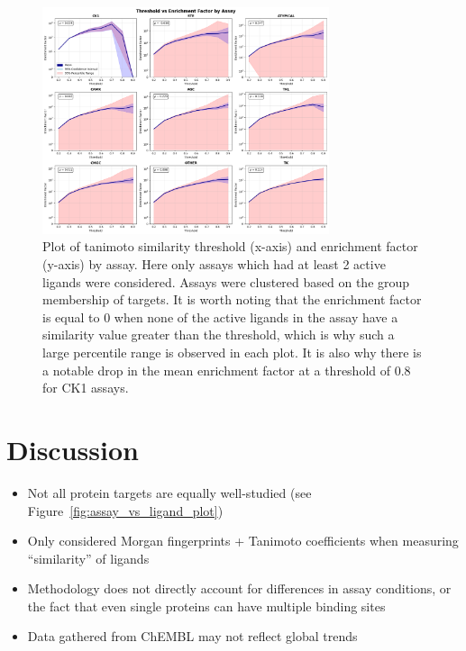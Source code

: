 \documentclass[11pt]{article}
\begin{document}
\begin{figure}[H]
    \centering
    \includegraphics[width=0.75\textwidth]{../figures/enrichment_factor_by_assay.png}
    \caption{Plot of tanimoto similarity threshold (x-axis) and enrichment factor (y-axis) by assay. Here only assays which had at least 2 active ligands were considered. Assays were clustered based on the group membership of targets. It is worth noting that the enrichment factor is equal to $0$ when none of the active ligands in the assay have a similarity value greater than the threshold, which is why such a large percentile range is observed in each plot. It is also why there is a notable drop in the mean enrichment factor at a threshold of $0.8$ for CK1 assays.}\label{fig:enrichment_by_assay}
\end{figure}

\section{Discussion}\label{sec:discussion}
\begin{itemize}
    \item Not all protein targets are equally well-studied (see Figure~\ref{fig:assay_vs_ligand_plot})
    \item Only considered Morgan fingerprints + Tanimoto coefficients when measuring ``similarity'' of ligands
    \item Methodology does not directly account for differences in assay conditions, or the fact that even single proteins can have multiple binding sites
    \item Data gathered from ChEMBL may not reflect global trends
\end{itemize}
\end{document}
